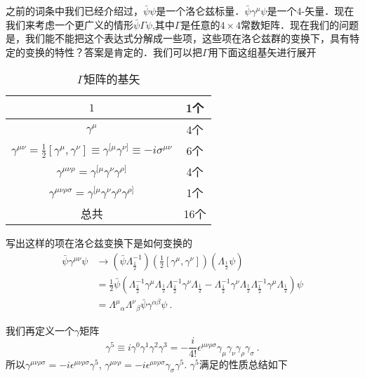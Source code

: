 
之前的词条中我们已经介绍过，$\bar \psi\psi$是一个洛仑兹标量．$\bar\psi\gamma^\mu\psi$是一个4-矢量．现在我们来考虑一个更广义的情形$\bar\psi\Gamma\psi$,其中$\Gamma$是任意的$4\times 4$常数矩阵．现在我们的问题是，我们能不能把这个表达式分解成一些项，这些项在洛仑兹群的变换下，具有特定的变换的特性？答案是肯定的．我们可以把$\Gamma$用下面这组基矢进行展开
\begin{table}[ht]
\centering
\caption{$\Gamma$矩阵的基矢}\label{diracm_tab1}
\begin{tabular}{|c|c|}
\hline
$1$ & 1个 \\
\hline
$\gamma^\mu$ & 4个 \\
\hline
$\gamma^{\mu\nu}=\frac{1}{2}[\gamma^\mu,\gamma^\nu]\equiv \gamma^{[\mu}\gamma^{\nu]}\equiv -i\sigma^{\mu\nu}$ & 6个 \\
\hline
$\gamma^{\mu\nu\rho}=\gamma^{[\mu}\gamma^\nu\gamma^{\rho]}$ & 4个 \\
\hline
$\gamma^{\mu\nu\rho\sigma}=\gamma^{[\mu}\gamma^\nu\gamma^\rho\gamma^{\rho]}$ & 1个 \\
\hline
总共 & 16个 \\
\hline
\end{tabular}
\end{table}
\begin{exercise}{写出这样的项在洛仑兹变换下是如何变换的}
\begin{align}\nonumber
\bar\psi\gamma^{\mu\nu}\psi & \rightarrow(\bar\psi\Lambda_{\frac{1}{2}}^{-1})(\frac{1}{2}[\gamma^\mu,\gamma^\nu])(\Lambda_{\frac{1}{2}}\psi)\\
\nonumber
& = \frac{1}{2} \bar\psi (\Lambda_{\frac{1}{2}}^{-1}\gamma^\mu\Lambda_{\frac{1}{2}}\Lambda_{\frac{1}{2}}^{-1}\gamma^\nu\Lambda_{\frac{1}{2}} - \Lambda_{\frac{1}{2}}^{-1}\gamma^\nu\Lambda_{\frac{1}{2}}\Lambda_{\frac{1}{2}}^{-1}\gamma^\mu\Lambda_{\frac{1}{2}})\psi \\
& = \Lambda^\mu{}_\alpha \Lambda^\nu{}_\beta\bar\psi\gamma^{\alpha\beta}\psi~.
\end{align}
\end{exercise}
我们再定义一个$\gamma$矩阵
\begin{equation}
\gamma^5\equiv i \gamma^0 \gamma^1\gamma^2\gamma^3 = -\frac{i}{4!}\epsilon^{\mu\nu\rho\sigma}\gamma_\mu\gamma_\nu\gamma_\rho\gamma_\sigma~.
\end{equation}
所以$\gamma^{\mu\nu\rho\sigma}=-i\epsilon^{\mu\nu\rho\sigma}\gamma^5$, $\gamma^{\mu\nu\rho} = -i\epsilon^{\mu\nu\rho\sigma}\gamma_\sigma\gamma^5$. $\gamma^5$满足的性质总结如下
